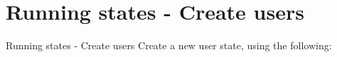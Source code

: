 \documentclass[dvipsnames]{beamer}
\begin{document}
\section{Running states - Create users}
\begin{frame}[fragile]{Running states - Create users}
Create a new user state, using the following:
\begin{lstlisting}[language=yaml]

\end{lstlisting}
\end{frame}
\end{document}
